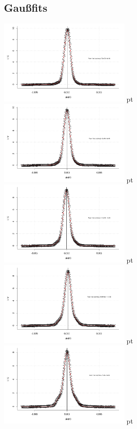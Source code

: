 \documentclass[12pt]{article}
\begin{document}
\subsection{Gaußfits}
\label{fitergebnisse}
\begin{minipage}[h!]{\textwidth}
	\centering
	\includegraphics[width=0.49\textwidth]{figures/ultraschall1.png} pt
	\includegraphics[width=0.49\textwidth]{figures/ultraschall2.png} pt
	\includegraphics[width=0.49\textwidth]{figures/ultraschall3.png} pt
	\includegraphics[width=0.49\textwidth]{figures/ultraschall4.png} pt
	\includegraphics[width=0.49\textwidth]{figures/ultraschall5.png} pt

\end{minipage}
\end{document}
